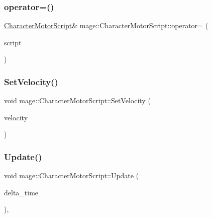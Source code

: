 \subsubsection{\texorpdfstring{operator=()}{operator=()}\hspace{0.1cm}{\footnotesize\ttfamily [2/2]}}
{\footnotesize\ttfamily \hyperlink{classmage_1_1_character_motor_script}{Character\+Motor\+Script}\& mage\+::\+Character\+Motor\+Script\+::operator= (\begin{DoxyParamCaption}\item[{\hyperlink{classmage_1_1_character_motor_script}{Character\+Motor\+Script} \&\&}]{script }\end{DoxyParamCaption})\hspace{0.3cm}{\ttfamily [delete]}}

\hypertarget{classmage_1_1_character_motor_script_a6978506d9a5e8911ee25e71302f8f850}{}\label{classmage_1_1_character_motor_script_a6978506d9a5e8911ee25e71302f8f850} 
\subsubsection{\texorpdfstring{Set\+Velocity()}{SetVelocity()}}
{\footnotesize\ttfamily void mage\+::\+Character\+Motor\+Script\+::\+Set\+Velocity (\begin{DoxyParamCaption}\item[{\hyperlink{namespacemage_aa97e833b45f06d60a0a9c4fc22ae02c0}{F32}}]{velocity }\end{DoxyParamCaption})\hspace{0.3cm}{\ttfamily [noexcept]}}

\hypertarget{classmage_1_1_character_motor_script_a67badc915464773eb874b318bd1f890a}{}\label{classmage_1_1_character_motor_script_a67badc915464773eb874b318bd1f890a} 
\subsubsection{\texorpdfstring{Update()}{Update()}}
{\footnotesize\ttfamily void mage\+::\+Character\+Motor\+Script\+::\+Update (\begin{DoxyParamCaption}\item[{\mbox{[}\mbox{[}maybe\+\_\+unused\mbox{]} \mbox{]} \hyperlink{namespacemage_ad26233bbec640deda836e572c1a23708}{F64}}]{delta\+\_\+time }\end{DoxyParamCaption})\hspace{0.3cm}{\ttfamily [override]}, {\ttfamily [virtual]}}

